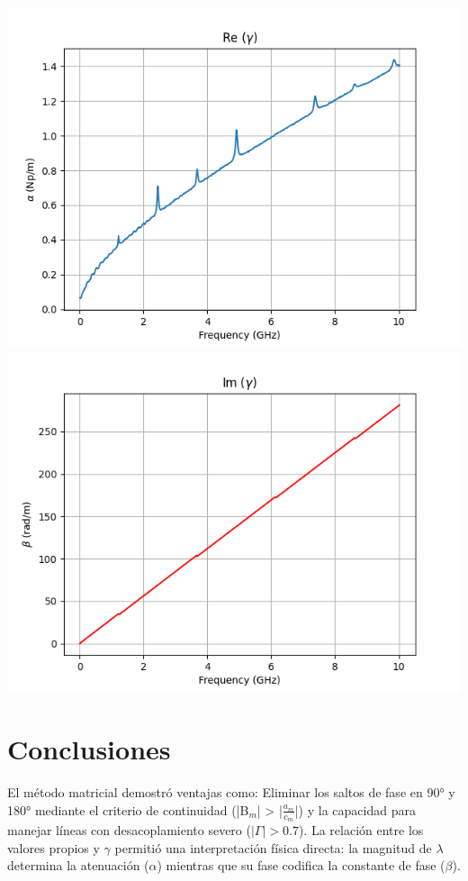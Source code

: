 \documentclass{article}   %
\theoremstyle{mytheoremstyle}
\theoremstyle{mytheoremstyle}
\theoremstyle{myproblemstyle}
\begin{document}
    \begin{minipage}{0.49\textwidth}   %
        \includegraphics[width=\textwidth]{figures/gamma_real.png}
        \label{fig:gamma_real}
        \includegraphics[width=\textwidth]{figures/gamma_imaginary.png}
        \label{fig:gamma_imag}

        {\centering\section*{\large Conclusiones}}
        El método matricial demostró ventajas como: Eliminar los saltos de fase en 90° y 180° mediante el criterio de continuidad (|B$_{m}$| > |$\frac{a_m}{c_m}$|)
        y la capacidad para manejar líneas con desacoplamiento severo ($|\Gamma| > 0.7$). La relación entre los valores propios y $\gamma$ permitió una interpretación 
        física directa: la magnitud de $\lambda$ determina la atenuación ($\alpha$) mientras que su fase codifica la constante de fase ($\beta$).
    \end{minipage}
\end{document}
